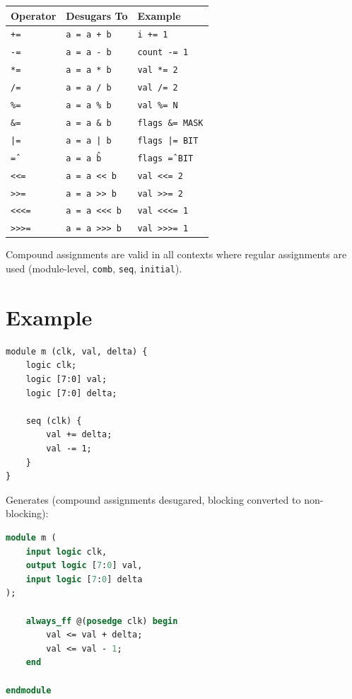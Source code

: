 \documentclass[lang=en,11pt]{elegantbook}
\newcommand{\code}[1]{\texttt{#1}}
\begin{document}
\begin{table}[htbp]
\centering
\begin{tabular}{lll}
\toprule
\textbf{Operator} & \textbf{Desugars To} & \textbf{Example} \\
\midrule
\code{+=}  & \code{a = a + b}   & \code{i += 1} \\
\code{-=}  & \code{a = a - b}   & \code{count -= 1} \\
\code{*=}  & \code{a = a * b}   & \code{val *= 2} \\
\code{/=}  & \code{a = a / b}   & \code{val /= 2} \\
\code{\%=} & \code{a = a \% b}  & \code{val \%= N} \\
\code{\&=} & \code{a = a \& b}  & \code{flags \&= MASK} \\
\code{|=}  & \code{a = a | b}   & \code{flags |= BIT} \\
\code{\^=} & \code{a = a \^ b}  & \code{flags \^= BIT} \\
\code{<<=} & \code{a = a << b}  & \code{val <<= 2} \\
\code{>>=} & \code{a = a >> b}  & \code{val >>= 2} \\
\code{<<<=} & \code{a = a <<< b} & \code{val <<<= 1} \\
\code{>>>=} & \code{a = a >>> b} & \code{val >>>= 1} \\
\bottomrule
\end{tabular}
\end{table}

Compound assignments are valid in all contexts where regular assignments are used (module-level, \code{comb}, \code{seq}, \code{initial}).

\section{Example}

\begin{lstlisting}[language=Slip]
module m (clk, val, delta) {
    logic clk;
    logic [7:0] val;
    logic [7:0] delta;

    seq (clk) {
        val += delta;
        val -= 1;
    }
}
\end{lstlisting}

Generates (compound assignments desugared, blocking converted to non-blocking):

\begin{lstlisting}[language=SystemVerilog]
module m (
    input logic clk,
    output logic [7:0] val,
    input logic [7:0] delta
);

    always_ff @(posedge clk) begin
        val <= val + delta;
        val <= val - 1;
    end

endmodule
\end{lstlisting}
\end{document}
